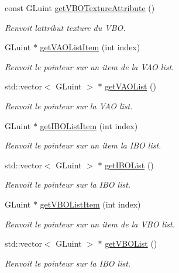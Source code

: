 \begin{DoxyCompactItemize}
const G\+Luint \hyperlink{classglimac_1_1CubeList_aa1d8214db32aa1e60d77b18559f0a2eb}{get\+V\+B\+O\+Texture\+Attribute} ()
\begin{DoxyCompactList}\small\item\em Renvoit l\textquotesingle{}attribut texture du V\+BO. \end{DoxyCompactList}\item 
G\+Luint $\ast$ \hyperlink{classglimac_1_1CubeList_a46cfba24380b3421086a0ac97ae4e789}{get\+V\+A\+O\+List\+Item} (int index)
\begin{DoxyCompactList}\small\item\em Renvoit le pointeur sur un item de la V\+AO list. \end{DoxyCompactList}\item 
std\+::vector$<$ G\+Luint $>$ $\ast$ \hyperlink{classglimac_1_1CubeList_aeb6239962da1abae9cfc0e773b71c485}{get\+V\+A\+O\+List} ()
\begin{DoxyCompactList}\small\item\em Renvoit le pointeur sur la V\+AO list. \end{DoxyCompactList}\item 
G\+Luint $\ast$ \hyperlink{classglimac_1_1CubeList_a1b1b153b8b2171e65e9c040cfa424892}{get\+I\+B\+O\+List\+Item} (int index)
\begin{DoxyCompactList}\small\item\em Renvoit le pointeur sur un item la I\+BO list. \end{DoxyCompactList}\item 
std\+::vector$<$ G\+Luint $>$ $\ast$ \hyperlink{classglimac_1_1CubeList_acd588ce7b0feb5f2fc72d6579887e47e}{get\+I\+B\+O\+List} ()
\begin{DoxyCompactList}\small\item\em Renvoit le pointeur sur la I\+BO list. \end{DoxyCompactList}\item 
G\+Luint $\ast$ \hyperlink{classglimac_1_1CubeList_a33f8d08aac4744c18d18969b0b16517c}{get\+V\+B\+O\+List\+Item} (int index)
\begin{DoxyCompactList}\small\item\em Renvoit le pointeur sur un item de la V\+BO list. \end{DoxyCompactList}\item 
std\+::vector$<$ G\+Luint $>$ $\ast$ \hyperlink{classglimac_1_1CubeList_a82eae5adc714b8f00a23e7ad8d2aee85}{get\+V\+B\+O\+List} ()
\begin{DoxyCompactList}\small\item\em Renvoit le pointeur sur la I\+BO list. \end{DoxyCompactList}\item 

\end{DoxyCompactItemize}

